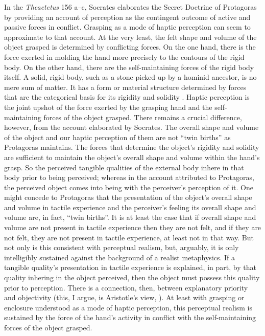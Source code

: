 \documentclass[12pt]{article}
\begin{document}
In the \emph{Theaetetus} 156 a--c, Socrates elaborates the Secret Doctrine of Protagoras by providing an account of perception as the contingent outcome of active and passive forces in conflict. Grasping as a mode of haptic perception can seem to approximate to that account. At the very least, the felt shape and volume of the object grasped is determined by conflicting forces. On the one hand, there is the force exerted in molding the hand more precisely to the contours of the rigid body. On the other hand, there are the self-maintaining forces of the rigid body itself. A solid, rigid body, such as a stone picked up by a hominid ancestor, is no mere sum of matter. It has a form or material structure determined by forces that are the categorical basis for its rigidity and solidity \citep{Johnston:2006js}. Haptic perception is the joint upshot of the force exerted by the grasping hand and the self-maintaining forces of the object grasped. There remains a crucial difference, however, from the account elaborated by Socrates. The overall shape and volume of the object and our haptic perception of them are not ``twin births'' as Protagoras maintains. The forces that determine the object's rigidity and solidity are sufficient to maintain the object's overall shape and volume within the hand's grasp. So the perceived tangible qualities of the external body inhere in that body prior to being perceived; whereas in the account attributed to Protagoras, the perceived object comes into being with the perceiver's perception of it. One might concede to Protagoras that the presentation of the object's overall shape and volume in tactile experience and the perceiver's feeling its overall shape and volume are, in fact, ``twin births''. It is at least the case that if overall shape and volume are not present in tactile experience then they are not felt, and if they are not felt, they are not present in tactile experience, at least not in that way. But not only is this consistent with perceptual realism, but, arguably, it is only intelligibly sustained against the background of a realist metaphysics. If a tangible quality's presentation in tactile experience is explained, in part, by that quality inhering in the object perceived, then the object must possess this quality prior to perception. There is a connection, then, between explanatory priority and objectivity (this, I argue, is Aristotle's view, \citealt{Kalderon:2015fr}). At least with grasping or enclosure understood as a mode of haptic perception, this perceptual realism is sustained by the force of the hand's activity in conflict with the self-maintaining forces of the object grasped.
\end{document}
